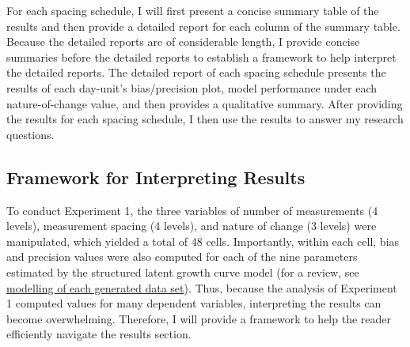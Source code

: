 \documentclass[
12pt, %
twoside,
english]{guelphthesis}
\begin{document}
For each spacing schedule, I will first present a concise summary table of the results and then provide a detailed report for each column of the summary table. Because the detailed reports are of considerable length, I provide concise summaries before the detailed reports to establish a framework to help interpret the detailed reports. The detailed report of each spacing schedule presents the results of each day-unit's bias/precision plot, model performance under each nature-of-change value, and then provides a qualitative summary. After providing the results for each spacing schedule, I then use the results to answer my research questions.

\hypertarget{framework-for-interpreting-results}{%
\subsection{Framework for Interpreting Results}\label{framework-for-interpreting-results}}

To conduct Experiment 1, the three variables of number of measurements (4 levels), measurement spacing (4 levels), and nature of change (3 levels) were manipulated, which yielded a total of 48 cells. Importantly, within each cell, bias and precision values were also computed for each of the nine parameters estimated by the structured latent growth curve model (for a review, see \protect\hyperlink{modelling-data-sets}{modelling of each generated data set}). Thus, because the analysis of Experiment 1 computed values for many dependent variables, interpreting the results can become overwhelming. Therefore, I will provide a framework to help the reader efficiently navigate the results section.
\end{document}
